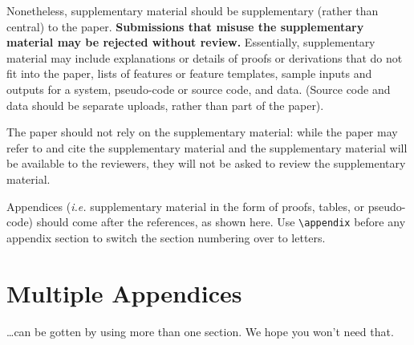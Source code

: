 \documentclass[11pt,a4paper]{article}
\begin{document}
Nonetheless, supplementary material should be supplementary (rather
than central) to the paper. \textbf{Submissions that misuse the supplementary 
material may be rejected without review.}
Essentially, supplementary material may include explanations or details
of proofs or derivations that do not fit into the paper, lists of
features or feature templates, sample inputs and outputs for a system,
pseudo-code or source code, and data. (Source code and data should
be separate uploads, rather than part of the paper).

The paper should not rely on the supplementary material: while the paper
may refer to and cite the supplementary material and the supplementary material will be available to the
reviewers, they will not be asked to review the
supplementary material.

Appendices ({\em i.e.} supplementary material in the form of proofs, tables,
or pseudo-code) should come after the references, as shown here. Use
\verb|\appendix| before any appendix section to switch the section
numbering over to letters.

\section{Multiple Appendices}
\dots can be gotten by using more than one section. We hope you won't
need that.
\end{document}
